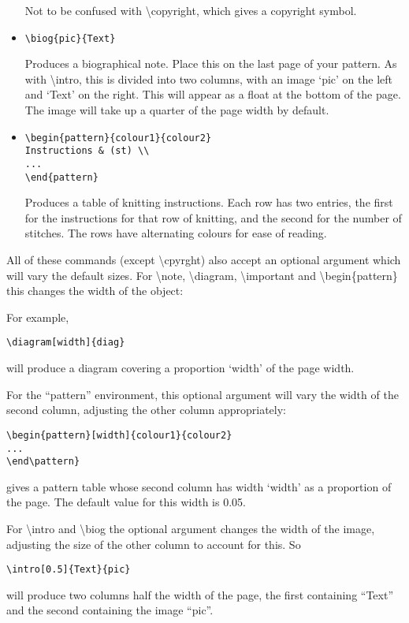 \documentclass{article}
\begin{document}
\begin{itemize}
Not to be confused with \textbackslash{}copyright, which gives a
copyright symbol.

\item
\begin{verbatim}
\biog{pic}{Text}
\end{verbatim}
Produces a biographical note.  Place this on the last page of your
pattern.  As with \textbackslash{}intro, this is divided into two
columns, with an image `pic' on the left and `Text' on the right.
This will appear as a float at the bottom of the page.  The image
will take up a quarter of the page width by default.

\item
\begin{verbatim}
\begin{pattern}{colour1}{colour2}
Instructions & (st) \\
...
\end{pattern}
\end{verbatim}
Produces a table of knitting instructions.  Each row has two entries,
the first for the instructions for that row of knitting, and the
second for the number of stitches.  The rows have alternating colours
for ease of reading.
\end{itemize}

All of these commands (except \textbackslash{}cpyrght) also accept an
optional argument which will vary the default sizes.  For
\textbackslash{}note, \textbackslash{}diagram,
\textbackslash{}important and \textbackslash{}begin\{pattern\} this
changes the width of the object:

For example,
\begin{verbatim}
\diagram[width]{diag}
\end{verbatim}
 will produce a diagram covering a
proportion `width' of the page width.

For the ``pattern'' environment, this optional argument will vary the
width of the second column, adjusting the other column appropriately:
\begin{verbatim}
\begin{pattern}[width]{colour1}{colour2}
...
\end\pattern} 
\end{verbatim}
gives a pattern table whose second column has width  `width' as a
proportion of the page.  The default value for this width is 0.05.

For \textbackslash{}intro and \textbackslash{}biog the optional
argument changes the width of the image, adjusting the size of the
other column to account for this.  So
\begin{verbatim}
\intro[0.5]{Text}{pic}
\end{verbatim}
 will produce two columns half the width of the page, the first
 containing ``Text'' and the second containing the image ``pic''.
\end{document}
